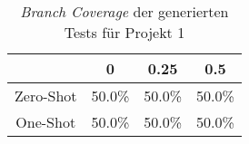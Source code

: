 \bgroup
\def\arraystretch{2}
\begin{table}[H]
	\vspace{.5cm}
	\centering		
	\begin{center}
		\begin{tabular}{|c||c|c|c|}
			\hline 
			& 0 & 0.25 & 0.5 \\
			\hline 
			\hline
			Zero-Shot & 50.0\% & 50.0\% & 50.0\% \\
			\hline
			One-Shot & 50.0\% & 50.0\% & 50.0\% \\
			\hline
		\end{tabular} 
	\end{center}
	\caption{\textit{Branch Coverage} der generierten Tests für Projekt 1}
	\label{fig:branch-1}
	\vspace{-.8cm}
\end{table}
\egroup